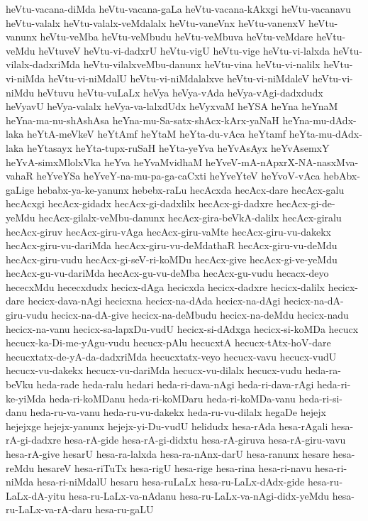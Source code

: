 {heVtu-vacana-diMda
heVtu-vacana-gaLa
heVtu-vacana-kAkxgi
heVtu-vacanavu
heVtu-valalx
heVtu-valalx-veMdalalx
heVtu-vaneVnx
heVtu-vanenxV
heVtu-vanunx
heVtu-veMba
heVtu-veMbudu
heVtu-veMbuva
heVtu-veMdare
heVtu-veMdu
heVtuveV
heVtu-vi-dadxrU
heVtu-vigU
heVtu-vige
heVtu-vi-lalxda
heVtu-vilalx-dadxriMda
heVtu-vilalxveMbu-danunx
heVtu-vina
heVtu-vi-nalilx
heVtu-vi-niMda
heVtu-vi-niMdalU
heVtu-vi-niMdalalxve
heVtu-vi-niMdaleV
heVtu-vi-niMdu
heVtuvu
heVtu-vuLaLx
heVya
heVya-vAda
heVya-vAgi-dadxdudx
heVyavU
heVya-valalx
heVya-va-lalxdUdx
heVyxvaM
heYSA
heYna
heYnaM
heYna-ma-nu-shAshAsa
heYna-mu-Sa-satx-shAcx-kArx-yaNaH
heYna-mu-dAdx-laka
heYtA-meVkeV
heYtAmf
heYtaM
heYta-du-vAca
heYtamf
heYta-mu-dAdx-laka
heYtasayx
heYta-tupx-ruSaH
heYta-yeYva
heYvAsAyx
heYvAsemxY
heYvA-simxMlolxVka
heYva
heYvaMvidhaM
heYveV-mA-nApxrX-NA-nasxMva-vahaR
heYveYSa
heYveY-na-mu-pa-ga-caCxti
heYveYteV
heYvoV-vAca
hebAbx-gaLige
hebabx-ya-ke-yanunx
hebebx-raLu
hecAcxda
hecAcx-dare
hecAcx-galu
hecAcxgi
hecAcx-gidadx
hecAcx-gi-dadxlilx
hecAcx-gi-dadxre
hecAcx-gi-de-yeMdu
hecAcx-gilalx-veMbu-danunx
hecAcx-gira-beVkA-dalilx
hecAcx-giralu
hecAcx-giruv
hecAcx-giru-vAga
hecAcx-giru-vaMte
hecAcx-giru-vu-dakekx
hecAcx-giru-vu-dariMda
hecAcx-giru-vu-deMdathaR
hecAcx-giru-vu-deMdu
hecAcx-giru-vudu
hecAcx-gi-seV-ri-koMDu
hecAcx-give
hecAcx-gi-ve-yeMdu
hecAcx-gu-vu-dariMda
hecAcx-gu-vu-deMba
hecAcx-gu-vudu
hecacx-deyo
hececxMdu
hececxdudx
hecicx-dAga
hecicxda
hecicx-dadxre
hecicx-dalilx
hecicx-dare
hecicx-dava-nAgi
hecicxna
hecicx-na-dAda
hecicx-na-dAgi
hecicx-na-dA-giru-vudu
hecicx-na-dA-give
hecicx-na-deMbudu
hecicx-na-deMdu
hecicx-nadu
hecicx-na-vanu
hecicx-sa-lapxDu-vudU
hecicx-si-dAdxga
hecicx-si-koMDa
hecucx
hecucx-ka-Di-me-yAgu-vudu
hecucx-pAlu
hecucxtA
hecucx-tAtx-hoV-dare
hecucxtatx-de-yA-da-dadxriMda
hecucxtatx-veyo
hecucx-vavu
hecucx-vudU
hecucx-vu-dakekx
hecucx-vu-dariMda
hecucx-vu-dilalx
hecucx-vudu
heda-ra-beVku
heda-rade
heda-ralu
hedari
heda-ri-dava-nAgi
heda-ri-dava-rAgi
heda-ri-ke-yiMda
heda-ri-koMDanu
heda-ri-koMDaru
heda-ri-koMDa-vanu
heda-ri-si-danu
heda-ru-va-vanu
heda-ru-vu-dakekx
heda-ru-vu-dilalx
hegaDe
hejejx
hejejxge
hejejx-yanunx
hejejx-yi-Du-vudU
helidudx
hesa-rAda
hesa-rAgali
hesa-rA-gi-dadxre
hesa-rA-gide
hesa-rA-gi-didxtu
hesa-rA-giruva
hesa-rA-giru-vavu
hesa-rA-give
hesarU
hesa-ra-lalxda
hesa-ra-nAnx-darU
hesa-ranunx
hesare
hesa-reMdu
hesareV
hesa-riTuTx
hesa-rigU
hesa-rige
hesa-rina
hesa-ri-navu
hesa-ri-niMda
hesa-ri-niMdalU
hesaru
hesa-ruLaLx
hesa-ru-LaLx-dAdx-gide
hesa-ru-LaLx-dA-yitu
hesa-ru-LaLx-va-nAdanu
hesa-ru-LaLx-va-nAgi-didx-yeMdu
hesa-ru-LaLx-va-rA-daru
hesa-ru-gaLU
}
